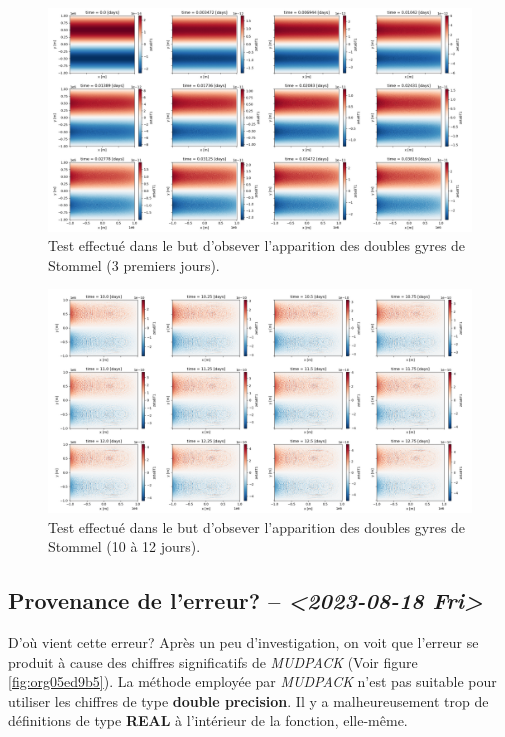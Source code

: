 \documentclass[10pt]{article}
\numberwithin{equation}{section}
\begin{document}
\begin{figure}[htbp]
\centering
\includegraphics[width=.9\linewidth]{figures/debuggage/2023_08_23_zetaBT_4filesperdays.png}
\caption{\label{fig:org2384351}Test effectué dans le but d'obsever l'apparition des doubles gyres de Stommel (3 premiers jours).}
\end{figure}

\begin{figure}[htbp]
\centering
\includegraphics[width=.9\linewidth]{figures/debuggage/2023_08_23_zetaBT_4filesperdays2.png}
\caption{\label{fig:orge213f4e}Test effectué dans le but d'obsever l'apparition des doubles gyres de Stommel (10 à 12 jours).}
\end{figure}


\subsection{Provenance de l'erreur? -- \textit{<2023-08-18 Fri>}}
\label{sec:orgcfb563a}
D'où vient cette erreur?
Après un peu d'investigation, on voit que l'erreur se produit à cause des chiffres significatifs de \emph{MUDPACK} (Voir figure \ref{fig:org05ed9b5}).
La  méthode employée par \emph{MUDPACK} n'est pas suitable pour utiliser les chiffres de type \textbf{double precision}.
Il y a malheureusement trop de définitions de type \textbf{REAL} à l'intérieur de la fonction, elle-même.
\end{document}
